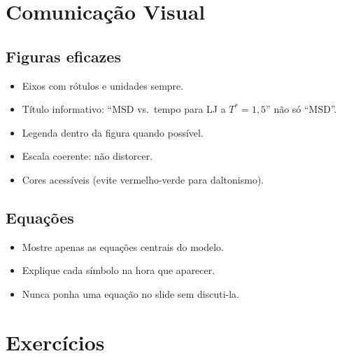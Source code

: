 \documentclass[12pt,a4paper]{article}
\begin{document}
\section*{Comunica\c{c}\~ao Visual}

\subsection*{Figuras eficazes}
\begin{itemize}
  \item Eixos com r\'otulos e unidades sempre.
  \item T\'itulo informativo: ``MSD vs.\ tempo para LJ a $T^*=1{,}5$'' n\~ao s\'o ``MSD''.
  \item Legenda dentro da figura quando poss\'ivel.
  \item Escala coerente: n\~ao distorcer.
  \item Cores acess\'iveis (evite vermelho-verde para daltonismo).
\end{itemize}

\subsection*{Equa\c{c}\~oes}
\begin{itemize}
  \item Mostre apenas as equa\c{c}\~oes centrais do modelo.
  \item Explique cada s\'imbolo na hora que aparecer.
  \item Nunca ponha uma equa\c{c}\~ao no slide sem discuti-la.
\end{itemize}

\section*{Exerc\'icios}
\end{document}
